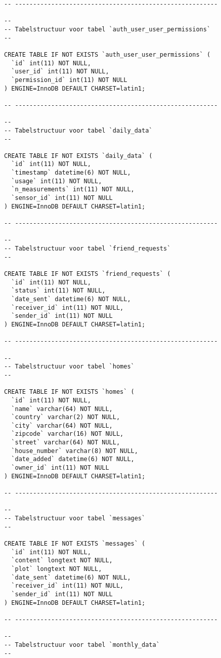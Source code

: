 \documentclass[11pt]{article}
\begin{document}
\begin{lstlisting}[style=SQL]
-- --------------------------------------------------------

--
-- Tabelstructuur voor tabel `auth_user_user_permissions`
--

CREATE TABLE IF NOT EXISTS `auth_user_user_permissions` (
  `id` int(11) NOT NULL,
  `user_id` int(11) NOT NULL,
  `permission_id` int(11) NOT NULL
) ENGINE=InnoDB DEFAULT CHARSET=latin1;

-- --------------------------------------------------------

--
-- Tabelstructuur voor tabel `daily_data`
--

CREATE TABLE IF NOT EXISTS `daily_data` (
  `id` int(11) NOT NULL,
  `timestamp` datetime(6) NOT NULL,
  `usage` int(11) NOT NULL,
  `n_measurements` int(11) NOT NULL,
  `sensor_id` int(11) NOT NULL
) ENGINE=InnoDB DEFAULT CHARSET=latin1;

-- --------------------------------------------------------

--
-- Tabelstructuur voor tabel `friend_requests`
--

CREATE TABLE IF NOT EXISTS `friend_requests` (
  `id` int(11) NOT NULL,
  `status` int(11) NOT NULL,
  `date_sent` datetime(6) NOT NULL,
  `receiver_id` int(11) NOT NULL,
  `sender_id` int(11) NOT NULL
) ENGINE=InnoDB DEFAULT CHARSET=latin1;

-- --------------------------------------------------------

--
-- Tabelstructuur voor tabel `homes`
--

CREATE TABLE IF NOT EXISTS `homes` (
  `id` int(11) NOT NULL,
  `name` varchar(64) NOT NULL,
  `country` varchar(2) NOT NULL,
  `city` varchar(64) NOT NULL,
  `zipcode` varchar(16) NOT NULL,
  `street` varchar(64) NOT NULL,
  `house_number` varchar(8) NOT NULL,
  `date_added` datetime(6) NOT NULL,
  `owner_id` int(11) NOT NULL
) ENGINE=InnoDB DEFAULT CHARSET=latin1;

-- --------------------------------------------------------

--
-- Tabelstructuur voor tabel `messages`
--

CREATE TABLE IF NOT EXISTS `messages` (
  `id` int(11) NOT NULL,
  `content` longtext NOT NULL,
  `plot` longtext NOT NULL,
  `date_sent` datetime(6) NOT NULL,
  `receiver_id` int(11) NOT NULL,
  `sender_id` int(11) NOT NULL
) ENGINE=InnoDB DEFAULT CHARSET=latin1;

-- --------------------------------------------------------

--
-- Tabelstructuur voor tabel `monthly_data`
--


\end{lstlisting}
\end{document}
